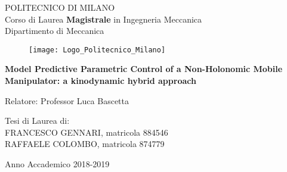\thispagestyle{empty}
\vspace*{-2cm} \bfseries{
\begin{center}
  \large
  POLITECNICO DI MILANO\\
  \normalsize
  Corso di Laurea \textbf{Magistrale} in Ingegneria Meccanica\\
  Dipartimento di Meccanica\\
  \begin{figure}[htbp]
    \begin{center}
      \texttt{[image: Logo\_Politecnico\_Milano]}
	 \centering
    \end{center}
  \end{figure}
  \vspace*{0.3cm} \LARGE


  \textbf{Model Predictive Parametric Control of a Non-Holonomic Mobile Manipulator: a kinodynamic hybrid approach}\\


\end{center}
\vspace*{1.5cm} \large
\begin{flushleft}


  Relatore: Professor Luca Bascetta \\
 

\end{flushleft}
\vspace*{1.5cm}
\begin{flushright}


  Tesi di Laurea di:\\ FRANCESCO GENNARI, matricola 884546 \\
  RAFFAELE COLOMBO, matricola 874779 \\

\end{flushright}
\vspace*{1.5cm}
\begin{center}



  Anno Accademico 2018-2019
\end{center} \clearpage
}
